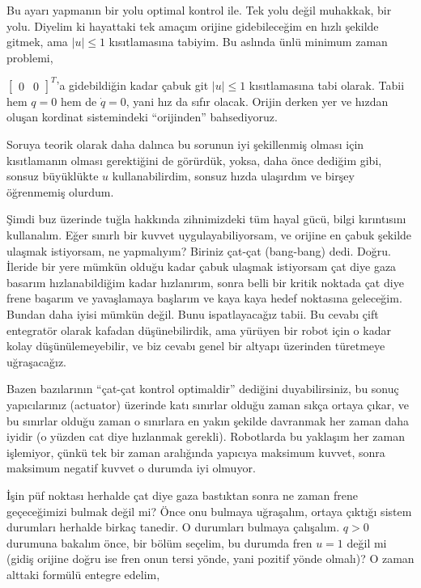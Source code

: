 \documentclass[12pt,fleqn]{article}\usepackage{../../common}
\begin{document}
Bu ayarı yapmanın bir yolu optimal kontrol ile. Tek yolu değil muhakkak,
bir yolu. Diyelim ki hayattaki tek amaçım orijine gidebileceğim en hızlı
şekilde gitmek, ama $|u| \le 1$ kısıtlamasına tabiyim. Bu aslında ünlü
minimum zaman problemi, 

$\left[\begin{array}{cc} 0 & 0 \end{array}\right]^T$'a gidebildiğin kadar
çabuk git $|u| \le 1$ kısıtlamasına tabi olarak. Tabii hem $q=0$ hem de
$\dot{q}=0$, yani hız da sıfır olacak. Orijin derken yer ve hızdan oluşan
kordinat sistemindeki ``orijinden'' bahsediyoruz. 

Soruya teorik olarak daha dalınca bu sorunun iyi şekillenmiş olması için
kısıtlamanın olması gerektiğini de görürdük, yoksa, daha önce dediğim gibi,
sonsuz büyüklükte $u$ kullanabilirdim, sonsuz hızda ulaşırdım ve birşey
öğrenmemiş olurdum. 

Şimdi buz üzerinde tuğla hakkında zihnimizdeki tüm hayal gücü, bilgi
kırıntısını kullanalım. Eğer sınırlı bir kuvvet uygulayabiliyorsam, ve
orijine en çabuk şekilde ulaşmak istiyorsam, ne yapmalıyım? Biriniz çat-çat
(bang-bang) dedi. Doğru. İleride bir yere mümkün olduğu kadar çabuk ulaşmak
istiyorsam çat diye gaza basarım hızlanabildiğim kadar hızlanırım, sonra
belli bir kritik noktada çat diye frene başarım ve yavaşlamaya başlarım ve
kaya kaya hedef noktasına geleceğim. Bundan daha iyisi mümkün değil. Bunu
ispatlayacağız tabii. Bu cevabı çift entegratör olarak kafadan
düşünebilirdik, ama yürüyen bir robot için o kadar kolay düşünülemeyebilir,
ve biz cevabı genel bir altyapı üzerinden türetmeye uğraşacağız.

Bazen bazılarının ``çat-çat kontrol optimaldir'' dediğini duyabilirsiniz,
bu sonuç yapıcılarınız (actuator) üzerinde katı sınırlar olduğu zaman sıkça
ortaya çıkar, ve bu sınırlar olduğu zaman o sınırlara en yakın şekilde
davranmak her zaman daha iyidir (o yüzden cat diye hızlanmak gerekli).
Robotlarda bu yaklaşım her zaman işlemiyor, çünkü tek bir zaman aralığında
yapıcıya maksimum kuvvet, sonra maksimum negatif kuvvet o durumda iyi
olmuyor.

İşin püf noktası herhalde çat diye gaza bastıktan sonra ne zaman frene
geçeceğimizi bulmak değil mi? Önce onu bulmaya uğraşalım, ortaya çıktığı
sistem durumları herhalde birkaç tanedir. O durumları bulmaya
çalışalım. $q>0$ durumuna bakalım önce, bir bölüm seçelim, bu durumda fren
$u=1$ değil mi (gidiş orijine doğru ise fren onun tersi yönde, yani pozitif
yönde olmalı)? O zaman alttaki formülü entegre edelim,
\end{document}
